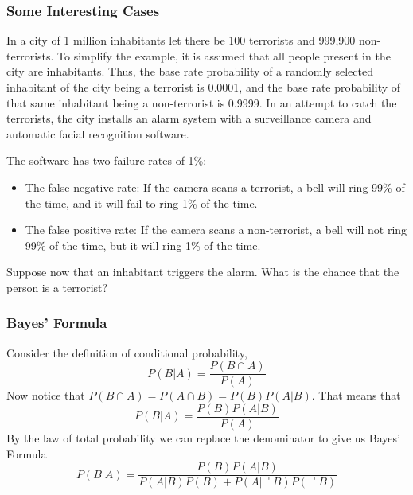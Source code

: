 \documentclass[xcolor=dvipsnames]{beamer}
\begin{document}
\begin{frame}
  \frametitle{Some Interesting Cases}
  In a city of 1 million inhabitants let there be 100 terrorists and
  999,900 non-terrorists. To simplify the example, it is assumed that
  all people present in the city are inhabitants. Thus, the base rate
  probability of a randomly selected inhabitant of the city being a
  terrorist is 0.0001, and the base rate probability of that same
  inhabitant being a non-terrorist is 0.9999. In an attempt to catch
  the terrorists, the city installs an alarm system with a
  surveillance camera and automatic facial recognition software.

The software has two failure rates of 1\%:
\begin{itemize}
\item The false negative rate: If the camera scans a terrorist, a bell
  will ring 99\% of the time, and it will fail to ring 1\% of the
  time.
\item The false positive rate: If the camera scans a non-terrorist, a
  bell will not ring 99\% of the time, but it will ring 1\% of the
  time.
\end{itemize}

Suppose now that an inhabitant triggers the alarm. What is the chance
that the person is a terrorist?
\end{frame}

\begin{frame}
  \frametitle{Bayes' Formula}
Consider the definition of conditional probability,
\begin{equation}
  \label{eq:ohyeweeb}
  P(B|A)=\frac{P(B\cap{}A)}{P(A)}
\end{equation}
Now notice that $P(B\cap{}A)=P(A\cap{}B)=P(B)P(A|B)$. That means that
\begin{equation}
  \label{eq:maifiepu}
  P(B|A)=\frac{P(B)P(A|B)}{P(A)}
\end{equation}
By the law of total probability we can replace the denominator to give
us \alert{Bayes' Formula}
\begin{equation}
  \label{eq:ohrughai}
  P(B|A)=\frac{P(B)P(A|B)}{P(A|B)P(B)+P(A|\urcorner{}B)P(\urcorner{}B)}
\end{equation}
\end{frame}
\end{document}
